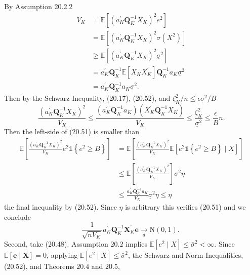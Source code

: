 \documentclass[10pt]{article}
\begin{document}
By Assumption 20.2.2
$$
\begin{aligned}
V_{K} &=\mathbb{E}\left[\left(a_{K}^{\prime} \boldsymbol{Q}_{K}^{-1} X_{K}\right)^{2} e^{2}\right] \\
&=\mathbb{E}\left[\left(a_{K}^{\prime} \boldsymbol{Q}_{K}^{-1} X_{K}\right)^{2} \sigma\left(X^{2}\right)\right] \\
& \geq \mathbb{E}\left[\left(a_{K}^{\prime} \boldsymbol{Q}_{K}^{-1} X_{K}\right)^{2} \underline{\sigma}^{2}\right] \\
&=a_{K}^{\prime} \boldsymbol{Q}_{K}^{-1} \mathbb{E}\left[X_{K} X_{K}^{\prime}\right] \boldsymbol{Q}_{K}^{-1} a_{K} \underline{\sigma}^{2} \\
&=a_{K}^{\prime} \boldsymbol{Q}_{K}^{-1} a_{K} \underline{\sigma}^{2} .
\end{aligned}
$$
Then by the Schwarz Inequality, (20.17), (20.52), and $\zeta_{K}^{2} / n \leq \epsilon \underline{\sigma}^{2} / B$
$$
\frac{\left(a_{K}^{\prime} \boldsymbol{Q}_{K}^{-1} X_{K}\right)^{2}}{V_{K}} \leq \frac{\left(a_{K}^{\prime} \boldsymbol{Q}_{K}^{-1} a_{K}\right)\left(X_{K}^{\prime} \boldsymbol{Q}_{K}^{-1} X_{K}\right)}{V_{K}} \leq \frac{\zeta_{K}^{2}}{\underline{\sigma}^{2}} \leq \frac{\epsilon}{B} n .
$$
Then the left-side of (20.51) is smaller than
$$
\begin{aligned}
\mathbb{E}\left[\frac{\left(a_{K}^{\prime} \boldsymbol{Q}_{K}^{-1} X_{K}\right)^{2}}{V_{K}} e^{2} \mathbb{1}\left\{e^{2} \geq B\right\}\right] &=\mathbb{E}\left[\frac{\left(a_{K}^{\prime} \boldsymbol{Q}_{K}^{-1} X_{K}\right)^{2}}{V_{K}} \mathbb{E}\left[e^{2} \mathbb{1}\left\{e^{2} \geq B\right\} \mid X\right]\right] \\
& \leq \mathbb{E}\left[\frac{\left(a_{K}^{\prime} \boldsymbol{Q}_{K}^{-1} X_{K}\right)^{2}}{V_{K}}\right] \underline{\sigma}^{2} \eta \\
& \leq \frac{a_{K}^{\prime} \boldsymbol{Q}_{K}^{-1} a_{K}}{V_{K}} \underline{\sigma}^{2} \eta \leq \eta
\end{aligned}
$$
the final inequality by (20.52). Since $\eta$ is arbitrary this verifies (20.51) and we conclude
$$
\frac{1}{\sqrt{n V_{K}}} a_{K}^{\prime} \boldsymbol{Q}_{K}^{-1} \boldsymbol{X}_{K}^{\prime} \boldsymbol{e} \underset{d}{\longrightarrow} \mathrm{N}(0,1) \text {. }
$$
Second, take (20.48). Assumption $20.2$ implies $\mathbb{E}\left[e^{2} \mid X\right] \leq \bar{\sigma}^{2}<\infty$. Since $\mathbb{E}[\boldsymbol{e} \mid \boldsymbol{X}]=0$, applying $\mathbb{E}\left[e^{2} \mid X\right] \leq \bar{\sigma}^{2}$, the Schwarz and Norm Inequalities, (20.52), and Theorems $20.4$ and $20.5$,
\end{document}
